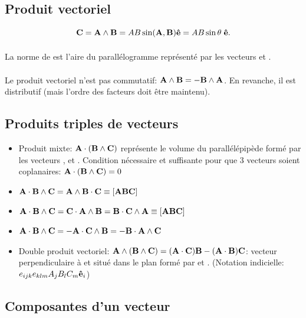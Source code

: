 \subsection{Produit vectoriel}
\[ \textbf{C} = \textbf{A} \wedge \textbf{B}=AB\sin(\textbf{A},\textbf{B})\textbf{ê}
= AB\sin\theta\hspace{0.1cm}\textbf{ê}. \]
\paragraph{}
La norme de  est l'aire du parallélogramme représenté par les vecteurs  et .
\paragraph{}
Le produit vectoriel n'est pas commutatif: $\textbf{A} \wedge \textbf{B} = -\textbf{B} \wedge \textbf{A}$. En revanche, il est distributif (mais l'ordre des facteurs doit être maintenu).

\subsection{Produits triples de vecteurs}
\begin{itemize}
  \item Produit mixte: $\textbf{A} \cdot (\textbf{B} \wedge \textbf{C})$ représente le volume du parallélépipède formé par les vecteurs ,  et . Condition nécessaire et suffisante pour que 3 vecteurs soient coplanaires: $\textbf{A}\cdot(\textbf{B}\wedge\textbf{C})=0$
  \item $\textbf{A}\cdot\textbf{B}\wedge\textbf{C}=\textbf{A}\wedge\textbf{B}\cdot\textbf{C}\equiv[\textbf{ABC}]$
  \item $\textbf{A}\cdot \textbf{B}\wedge\textbf{C} = \textbf{C}\cdot\textbf{A}\wedge\textbf{B}=\textbf{B}\cdot\textbf{C}\wedge\textbf{A}\equiv[\textbf{ABC}]$
  \item $\textbf{A}\cdot \textbf{B}\wedge\textbf{C} = -\textbf{A}\cdot\textbf{C}\wedge\textbf{B}=-\textbf{B}\cdot\textbf{A}\wedge\textbf{C}$
  \item Double produit vectoriel: $\textbf{A}\wedge(\textbf{B}\wedge\textbf{C})=(\textbf{A}\cdot\textbf{C})\textbf{B}-(\textbf{A}\cdot\textbf{B})\textbf{C}$: vecteur perpendiculaire à  et situé dans le plan formé par  et . (Notation indicielle: $e_{ijk}e_{klm}A_jB_lC_m\textbf{ê}_i$)
\end{itemize}

\subsection{Composantes d'un vecteur}

